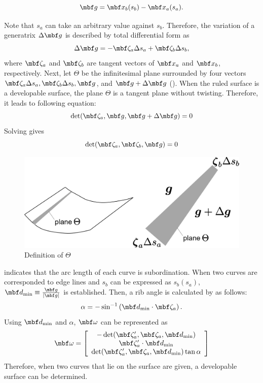 \documentclass[E]{scitrans}
\begin{document}
\begin{equation}
\mbold{g} = \mbold{x}_b(s_b)-\mbold{x}_a(s_a).
\end{equation}

Note that $s_a$ can take an arbitrary value against $ s_b $. Therefore, the variation of a generatrix $ \Delta \mbold{g} $ is described by total differential form as
\begin{equation}
\Delta \mbold{g} = -\zetavec_a \Delta s_a + \zetavec_b \Delta s_b,
\end{equation}
where $ \zetavec_a$ and $\zetavec_b $ are tangent vectors of $ \mbold{x}_a $ and $ \mbold{x}_b $, respectively. Next, let $ \Theta $ be the infinitesimal plane surrounded by four vectors $ \zetavec_a \Delta s_a, \zetavec_b \Delta s_b,\mbold{g}$, and $\mbold{g}+\Delta \mbold{g} $ (). When the ruled surface is a developable surface, the plane $ \Theta $ is a tangent plane without twisting. Therefore, it leads to following equation:
\begin{equation}
\det (\zetavec_a, \mbold{g}, \mbold{g}+\Delta \mbold{g})=0
\label{eq:det_developeq}
\end{equation}
Solving  gives
\begin{equation}
\det (\zetavec_a, \zetavec_b, \mbold{g})=0
\label{eq:Cond1}
\end{equation}
\begin{figure}[!h]
	\centering
	\includegraphics[width = 0.8\columnwidth]{./figure/Theta.eps}
	\caption{Definition of $ \Theta $}
	\label{fig:Theta}
\end{figure}
 indicates that the arc length of each curve is subordination. When two curves are corresponded to edge lines and $s_b$ can be expressed as $s_b(s_a)$, $\mbold{d}_{\min}\equiv\frac{\mbold{g}}{|\mbold{g}|}$ is established. Then, a rib angle is calculated by  as follows:
\begin{equation}
\alpha = -\sin^{-1}\left( \mbold{d}_{\min} \cdot \zetavec_a \right).
\end{equation}
Using $\mbold{d}_{\min}$ and $\alpha$, $\mbold{\omega}$ can be represented as
\begin{equation}\label{eq:omegaVec}
\mbold{\omega} = \left[\begin{array}{c} -\det(\zetavec_a',\zetavec_a, \mbold{d}_{\min} ) \\ \zetavec_a' \cdot \mbold{d}_{\min} \\ \det(\zetavec_a',\zetavec_a, \mbold{d}_{\min} ) \tan \alpha \end{array}\right] 
\end{equation}
Therefore, when two curves that lie on the surface are given, a developable surface can be determined.
\end{document}
